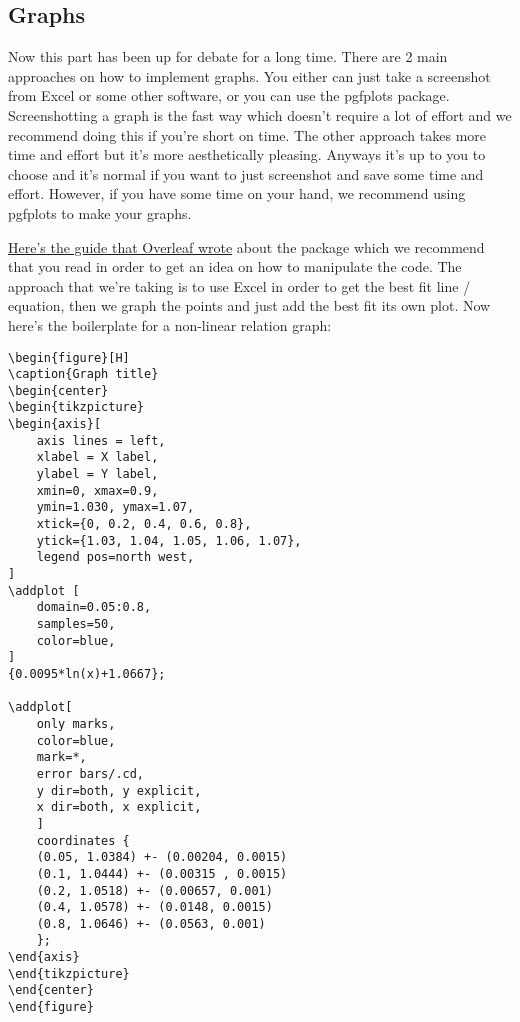\subsection{Graphs}
Now this part has been up for debate for a long time.
There are 2 main approaches on how to implement graphs.
You either can just take a screenshot from Excel or some other software,
or you can use the pgfplots package.
Screenshotting a graph is the fast way which doesn't require a lot of effort
and we recommend doing this if you're short on time.
The other approach takes more time and effort but it's more aesthetically pleasing.
Anyways it's up to you to choose and it's normal if you want to just screenshot and save some time and effort.
However, if you have some time on your hand, we recommend using pgfplots to make your graphs.

\href{https://www.overleaf.com/learn/latex/Pgfplots_package}{Here's the guide that Overleaf wrote}
about the package which we recommend that you read in order to get an idea on how to manipulate the code.
The approach that we're taking is to use Excel in order to get the best fit line / equation,
then we graph the points and just add the best fit its own plot.
Now here's the boilerplate for a non-linear relation graph:

\begin{verbatim}
\begin{figure}[H]
\caption{Graph title}
\begin{center}
\begin{tikzpicture}
\begin{axis}[
    axis lines = left,
    xlabel = X label,
    ylabel = Y label,
    xmin=0, xmax=0.9,
    ymin=1.030, ymax=1.07,
    xtick={0, 0.2, 0.4, 0.6, 0.8},
    ytick={1.03, 1.04, 1.05, 1.06, 1.07},
    legend pos=north west,
]
\addplot [
    domain=0.05:0.8, 
    samples=50, 
    color=blue,
]
{0.0095*ln(x)+1.0667};
 
\addplot[
    only marks,
    color=blue,
    mark=*,
    error bars/.cd,
    y dir=both, y explicit,
    x dir=both, x explicit,
    ]
    coordinates {
    (0.05, 1.0384) +- (0.00204, 0.0015)
    (0.1, 1.0444) +- (0.00315 , 0.0015)
    (0.2, 1.0518) +- (0.00657, 0.001)
    (0.4, 1.0578) +- (0.0148, 0.0015)
    (0.8, 1.0646) +- (0.0563, 0.001)
    };
\end{axis}
\end{tikzpicture}
\end{center}
\end{figure}
\end{verbatim}

